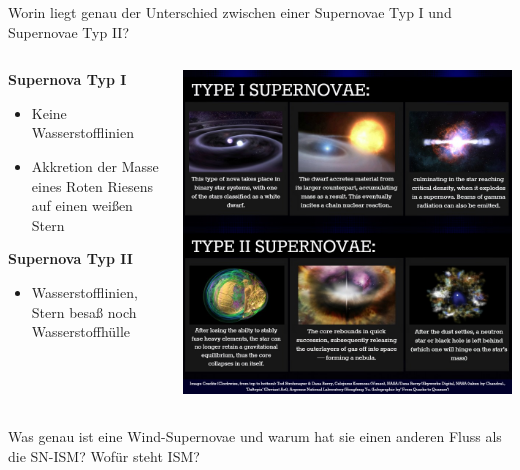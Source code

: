 \begin{frame}{Worin liegt genau der Unterschied zwischen einer Supernovae Typ I und Supernovae Typ II?}
\begin{columns}
  \begin{column}{0.5\textwidth}
    \textbf{Supernova Typ I}
    \begin{itemize}
      \item Keine Wasserstofflinien
      \item Akkretion der Masse eines Roten Riesens auf einen weißen Stern
      \end{itemize}
      \vspace{1em}
      \textbf{Supernova Typ II}
      \begin{itemize}
        \item Wasserstofflinien, Stern besaß noch Wasserstoffhülle
      \end{itemize}
  \end{column}
  \begin{column}{0.5\textwidth}
      \includegraphics[width=\textwidth]{images/supernova.png}
    \end{column}
\end{columns}
\end{frame}


\begin{frame}{Was genau ist eine Wind-Supernovae und warum hat sie einen anderen Fluss als die SN-ISM? Wofür steht ISM?}
\end{frame}


